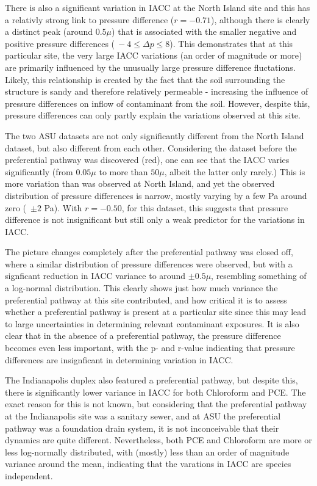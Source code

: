 \documentclass[journal=esthag,manuscript=article]{achemso}
\begin{document}
There is also a significant variation in IACC at the North Island site and this has a relativly strong link to pressure difference ($r = -0.71$), although there is clearly a distinct peak (around $0.5\mu$) that is associated with the smaller negative and positive pressure differences ($~-4 \leq \Delta p \leq 8$).
This demonstrates that at this particular site, the very large IACC variations (an order of magnitude or more) are primarily influenced by the unusually large pressure difference fluctations.
Likely, this relationship is created by the fact that the soil surrounding the structure is sandy and therefore relatively permeable - increasing the influence of pressure differences on inflow of contaminant from the soil.
However, despite this, pressure differences can only partly explain the variations observed at this site.\par
The two ASU datasets are not only significantly different from the North Island dataset, but also different from each other.
Considering the dataset before the preferential pathway was discovered (red), one can see that the IACC varies significantly (from $0.05 \mu$ to more than $50 \mu$, albeit the latter only rarely.)
This is more variation than was observed at North Island, and yet the observed distribution of pressure differences is narrow, mostly varying by a few Pa around zero (~$\pm 2$ Pa).
With $r = -0.50$, for this dataset, this suggests that pressure difference is not insignificant but still only a weak predictor for the variations in IACC.\par

The picture changes completely after the preferential pathway was closed off, where a similar distribution of pressure differences were observed, but with a signficant reduction in IACC variance to around $\pm 0.5 \mu$, resembling something of a log-normal distribution.
This clearly shows just how much variance the preferential pathway at this site contributed, and how critical it is to assess whether a preferential pathway is present at a particular site since this may lead to large uncertainties in determining relevant contaminant exposures.
It is also clear that in the absence of a preferential pathway, the pressure difference becomes even less important, with the p- and r-value indicating that pressure differences are insignficant in determining variation in IACC.\par
The Indianapolis duplex also featured a preferential pathway, but despite this, there is significantly lower variance in IACC for both Chloroform and PCE\cite{mchugh_evidence_2017}.
The exact reason for this is not known, but considering that the preferential pathway at the Indianapolis site was a sanitary sewer, and at ASU the preferential pathway was a foundation drain system, it is not inconceivable that their dynamics are quite different.
Nevertheless, both PCE and Chloroform are more or less log-normally distributed, with (mostly) less than an order of magnitude variance around the mean, indicating that the varations in IACC are species independent.\par
\end{document}
